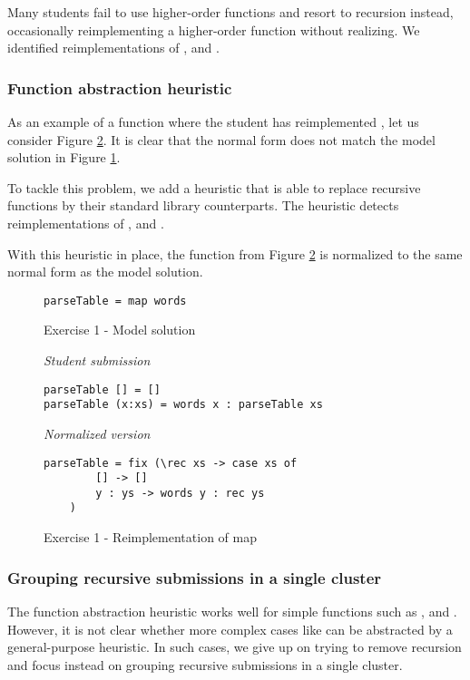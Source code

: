 Many students fail to use higher-order functions and resort to recursion instead, occasionally reimplementing a higher-order function without realizing. We identified reimplementations of ,  and .

\subsubsection{Function abstraction heuristic}

As an example of a function where the student has reimplemented , let us consider Figure \ref{fig:ex1-reimplementation-map}.  It is clear that the normal form does not match the model solution in Figure \ref{fig:ex1-model-solution}.

To tackle this problem, we add a heuristic that is able to replace recursive functions by their standard library counterparts. The heuristic detects reimplementations of ,  and .

With this heuristic in place, the function from Figure \ref{fig:ex1-reimplementation-map} is normalized to the same normal form as the model solution.

\begin{figure}
\begin{verbatim}
parseTable = map words
\end{verbatim}
\caption{Exercise 1 - Model solution}
\label{fig:ex1-model-solution}
\end{figure}

\begin{figure}
\centering
\emph{Student submission}
\begin{verbatim}
parseTable [] = []
parseTable (x:xs) = words x : parseTable xs
\end{verbatim}
\bigskip
\emph{Normalized version}
\begin{verbatim}
parseTable = fix (\rec xs -> case xs of
        [] -> []
        y : ys -> words y : rec ys
    )
\end{verbatim}
\caption{Exercise 1 - Reimplementation of map}
\label{fig:ex1-reimplementation-map}
\end{figure}

\subsubsection{Grouping recursive submissions in a single cluster}

The function abstraction heuristic works well for simple functions such as ,  and . However, it is not clear whether more complex cases like  can be abstracted by a general-purpose heuristic. In such cases, we give up on trying to remove recursion and focus instead on grouping recursive submissions in a single cluster.

